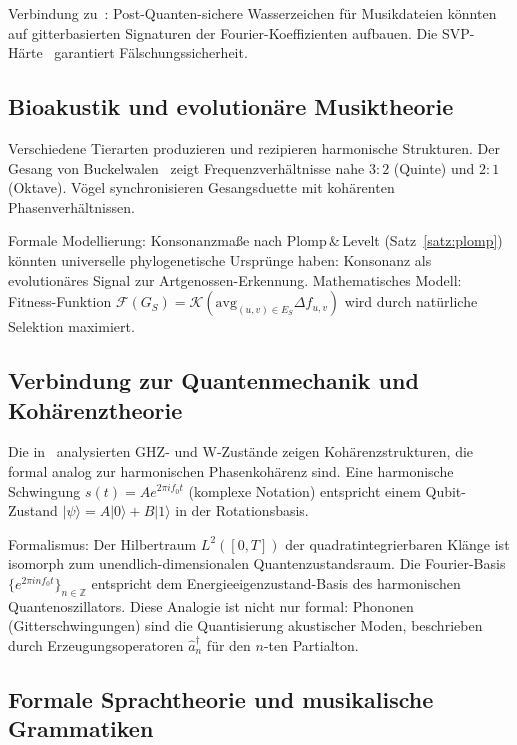 ﻿\documentclass[a4paper,12pt]{article}
\theoremstyle{definition}
\begin{document}
Verbindung zu~\cite{epp2026pqc}: Post-Quanten-sichere Wasserzeichen für
Musikdateien könnten auf gitterbasierten Signaturen der Fourier-Koeffizienten
aufbauen. Die SVP-Härte~\cite{epp2026lattice} garantiert Fälschungssicherheit.

\subsection{Bioakustik und evolutionäre Musiktheorie}

Verschiedene Tierarten produzieren und rezipieren harmonische Strukturen. Der
Gesang von Buckelwalen~\cite{epp2026whale} zeigt Frequenzverhältnisse nahe $3:2$
(Quinte) und $2:1$ (Oktave). Vögel synchronisieren Gesangsduette mit kohärenten
Phasenverhältnissen.

Formale Modellierung: Konsonanzmaße nach Plomp\,\&\,Levelt (Satz~\ref{satz:plomp})
könnten universelle phylogenetische Ursprünge haben: Konsonanz als evolutionäres
Signal zur Artgenossen-Erkennung. Mathematisches Modell: Fitness-Funktion
$\mathcal{F}(G_S) = \mathcal{K}(\mathrm{avg}_{(u,v) \in E_S} \Delta f_{u,v})$
wird durch natürliche Selektion maximiert.

\subsection{Verbindung zur Quantenmechanik und Kohärenztheorie}

Die in~\cite{epp2026quantum} analysierten GHZ- und W-Zustände zeigen
Kohärenzstrukturen, die formal analog zur harmonischen Phasenkohärenz sind.
Eine harmonische Schwingung $s(t) = A e^{2\pi i f_0 t}$ (komplexe Notation)
entspricht einem Qubit-Zustand $|\psi\rangle = A|0\rangle + B|1\rangle$ in der
Rotationsbasis.

Formalismus: Der Hilbertraum $L^2([0,T])$ der quadratintegrierbaren Klänge
ist isomorph zum unendlich-dimensionalen Quantenzustandsraum. Die Fourier-Basis
$\{e^{2\pi i n f_0 t}\}_{n \in \mathbb{Z}}$ entspricht dem Energieeigenzustand-Basis
des harmonischen Quantenoszillators. Diese Analogie ist nicht nur formal:
Phononen (Gitterschwingungen) sind die Quantisierung akustischer Moden,
beschrieben durch Erzeugungsoperatoren $\hat{a}^\dagger_n$ für den $n$-ten
Partialton.

\subsection{Formale Sprachtheorie und musikalische Grammatiken}
\end{document}

